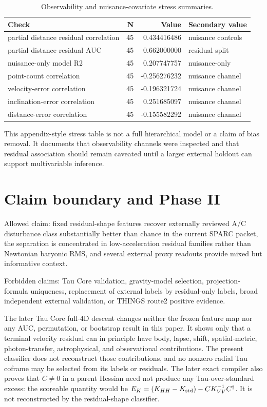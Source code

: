 \documentclass[11pt]{article}
\begin{document}
\begin{table}[H]
\centering
\caption{Observability and nuisance-covariate stress summaries.}
\footnotesize
\begin{tabular}{lrrl}
\toprule
Check & N & Value & Secondary value\\
\midrule
partial distance residual correlation & 45 & 0.434416486 & nuisance controls\\
partial distance residual AUC & 45 & 0.662000000 & residual split\\
nuisance-only model R2 & 45 & 0.207747757 & nuisance-only\\
point-count correlation & 45 & -0.256276232 & nuisance channel\\
velocity-error correlation & 45 & -0.196321724 & nuisance channel\\
inclination-error correlation & 45 & 0.251685097 & nuisance channel\\
distance-error correlation & 45 & -0.155582292 & nuisance channel\\
\bottomrule
\end{tabular}
\end{table}

This appendix-style stress table is not a full hierarchical model or a claim of bias removal. It documents that observability channels were inspected and that residual association should remain caveated until a larger external holdout can support multivariable inference.

\section{Claim boundary and Phase II}

Allowed claim: fixed residual-shape features recover externally reviewed A/C disturbance class substantially better than chance in the current SPARC packet, the separation is concentrated in low-acceleration residual families rather than Newtonian baryonic RMS, and several external proxy readouts provide mixed but informative context.

Forbidden claims: Tau Core validation, gravity-model selection, projection-formula uniqueness, replacement of external labels by residual-only labels, broad independent external validation, or THINGS route2 positive evidence.

The later Tau Core full-4D descent changes neither the frozen feature map nor any AUC, permutation, or bootstrap result in this paper.  It shows only that a terminal velocity residual can in principle have body, lapse, shift, spatial-metric, photon-transfer, astrophysical, and observational contributions.  The present classifier does not reconstruct those contributions, and no nonzero radial Tau coframe may be selected from its labels or residuals.  The later exact compiler also proves that $C\neq0$ in a parent Hessian need not produce any Tau-over-standard excess: the scoreable quantity would be $E_K=(K_{HH}-K_{\rm std})-CK_{VV}^{-1}C^\dagger$.  It is not reconstructed by the residual-shape classifier.
\end{document}
